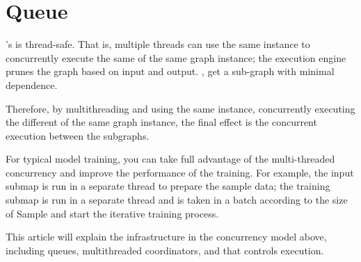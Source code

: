 \begin{savequote}[45mm]
\end{savequote}


\chapter{Queue} 
\label{ch:queue}
\begin{content}
's  is thread-safe. That is, multiple threads can use the same  instance to concurrently execute the same  of the same graph instance; the  execution engine prunes the graph based on input and output. , get a sub-graph with minimal dependence.

Therefore, by multithreading and using the same  instance, concurrently executing the different  of the same graph instance, the final effect is the concurrent execution between the subgraphs.

For typical model training, you can take full advantage of the  multi-threaded concurrency and improve the performance of the training. For example, the input submap is run in a separate thread to prepare the sample data; the training submap is run in a separate thread and is taken in a batch according to the size of  Sample and start the iterative training process.

This article will explain the infrastructure in the concurrency model above, including queues, multithreaded coordinators, and  that controls  execution.

\end{content}


